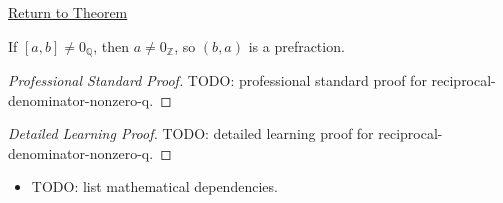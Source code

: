 \newpage
{}
\label{prf:reciprocal-denominator-nonzero-q}

\begin{remark*}[Return]
\hyperref[lem:reciprocal-denominator-nonzero-q]{Return to Theorem}
\end{remark*}

\begin{lemma*}
If $[a,b]\ne 0_{\mathbb{Q}}$, then $a\ne 0_{\mathbb{Z}}$, so $(b,a)$ is a
prefraction.
\end{lemma*}

\begin{proof}[Professional Standard Proof]
\LRAProofBodyStart
TODO: professional standard proof for reciprocal-denominator-nonzero-q.
\end{proof}

\begin{proof}[Detailed Learning Proof]
\LRAProofBodyStart
TODO: detailed learning proof for reciprocal-denominator-nonzero-q.
\end{proof}

\begin{remark*}
\end{remark*}

\begin{dependencies}
\begin{itemize}
  \item TODO: list mathematical dependencies.
\end{itemize}
\end{dependencies}

\clearpage
